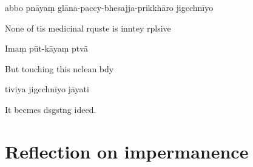 abbo pnāyaṃ glāna-paccy-bhesajja-prikkhāro jigcchnīyo

\begin{english}
  None of tis medicinal rquste is inntey rplsive
\end{english}

Imaṃ pūt-kāyaṃ ptvā

\begin{english}
  But touching this nclean bdy
\end{english}

tiviya jigcchnīyo jāyati

\begin{english}
  It becmes dsgstng ideed.
\end{english}

\chapter{Reflection on impermanence}%

\begin{leader}
\end{leader}

